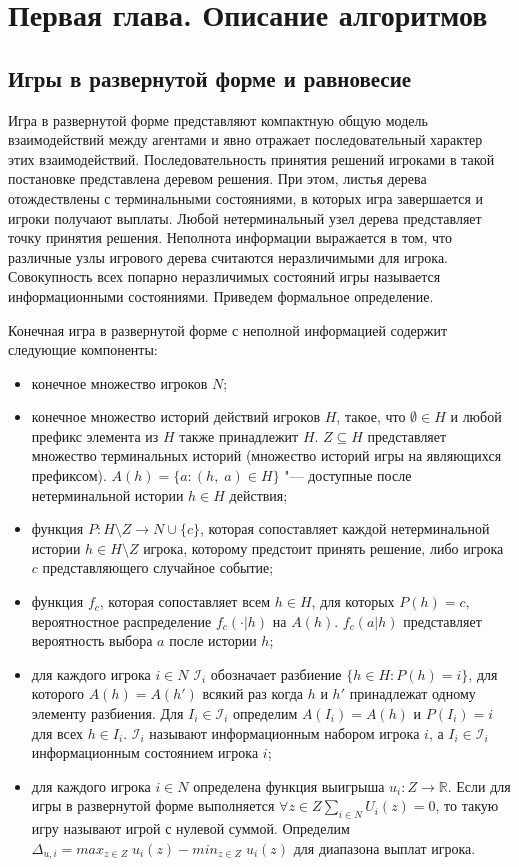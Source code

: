 \chapter{Первая глава. Описание алгоритмов}
\label{cha:ch_1}
\section{Игры в развернутой форме и равновесие}
\par
Игра в развернутой форме представляют компактную общую модель взаимодействий между агентами и явно отражает последовательный характер этих взаимодействий. Последовательность принятия решений игроками в такой постановке представлена деревом решения. При этом, листья дерева отождествлены с терминальными состояниями, в которых игра завершается и игроки получают выплаты. Любой нетерминальный узел дерева представляет точку принятия решения. Неполнота информации выражается в том, что различные узлы игрового дерева считаются неразличимыми для игрока. Совокупность всех попарно неразличимых состояний игры называется информационными состояниями. Приведем формальное определение.
\par
\begin{defin}\label{def1}
Конечная игра в развернутой форме с неполной информацией содержит следующие компоненты:
\end{defin}
\begin{itemize}
	\item конечное множество игроков $N$;
	\item конечное множество историй действий игроков $H$, такое, что $\emptyset \in H$ и любой префикс элемента из $H$ также принадлежит $H$. $Z \subseteq H$ представляет множество терминальных историй (множество историй игры на являющихся префиксом). $A(h)=\{a \colon (h,\;a)\in H \}$ "--- доступные после нетерминальной истории $h\in H$ действия;
	\item функция $P\colon H\setminus Z \to N \cup \{c\}$, которая сопоставляет каждой нетерминальной истории $h\in H\setminus Z$ игрока, которому предстоит принять решение, либо игрока $c$ представляющего случайное событие;
	\item функция $f_c$, которая сопоставляет всем $h \in H$, для которых $P(h)=c$, вероятностное распределение $f_c(\cdot |h)$ на $A(h)$. $f_c(a|h)$ представляет вероятность выбора $a$ после истории $h$;
	\item для каждого игрока $i \in N$ $\mathcal{I}_i $ обозначает разбиение $ \{h \in H \colon P(h) = i\}$, для которого $A(h)=A(h')$ всякий раз когда $h$ и $h'$ принадлежат одному элементу разбиения. Для $I_i \in \mathcal{I}_i$ определим $A(I_i)=A(h)$ и $P(I_i)=i$ для всех $h \in I_i$. $\mathcal{I}_i$ называют информационным набором игрока $i$, а $I_i \in \mathcal{I}_i$ информационным состоянием игрока $i$;
	\item для каждого игрока $i \in N$ определена функция выигрыша $u_i \colon Z \to \mathbb{R}$. Если для игры в развернутой форме выполняется $\forall z \in Z \sum_{i \in N}U_i(z) = 0 $, то такую игру называют игрой с нулевой суммой. Определим $\Delta_{u,i} = max_{z\in Z}\;u_i(z) - min_{z\in Z}\;u_i(z)$ для диапазона выплат игрока. 
\end{itemize}
